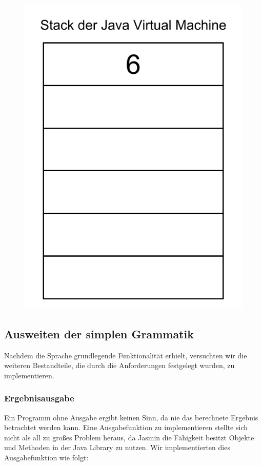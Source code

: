 \begin{figure}[htb]
\begin{center}
{	\includegraphics[scale=0.2]{pics/stack_visual(3).png}
}\\
\end{center}
\end{figure}
\pagebreak

\subsection{Ausweiten der simplen Grammatik}
Nachdem die Sprache grundlegende Funktionalität erhielt, versuchten wir die weiteren Bestandteile, die durch die Anforderungen festgelegt wurden, zu implementieren. 


\subsubsection{Ergebnisausgabe}
Ein Programm ohne Ausgabe ergibt keinen Sinn, da nie das berechnete Ergebnis betrachtet werden kann. Eine Ausgabefunktion zu implementieren stellte sich nicht als all zu großes Problem heraus, da Jasmin die Fähigkeit besitzt Objekte und Methoden in der Java Library zu nutzen. Wir implementierten dies Ausgabefunktion wie folgt:

